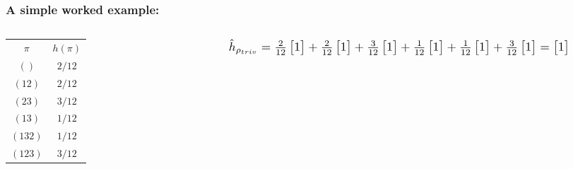 \documentclass{beamer} %
\theoremstyle{definition} %
\def \pausenl {\pause $ \ $\\}
\begin{document}
\begin{frame}
	\frametitle{A simple worked example:}
	
	\begin{columns}
		\begin{column}{.2\textwidth}

		


			\begin{tabular}{c<{\onslide<2->}c<{\onslide<1->}}
				$\pi$ & $h(\pi)$          \\
				$()$   & $2/12$   \\
				$(12)$   & $2/12$  \\
				$(23)$   & $3/12$  \\
				$(13)$   & $1/12$  \\
				$(132)$   & $1/12$  	\\
				$(123)$   & $3/12$    			
			\end{tabular}
\end{column}

\begin{column}{.8\textwidth}
	\pause
	\begin{equation*}
	\resizebox{\textwidth}{!}{$\hat{h}_{\rho_{triv}} = 
		\frac{2}{12}\begin{bmatrix} 1 \end{bmatrix} + 
		\frac{2}{12}\begin{bmatrix} 1 \end{bmatrix} + 
		\frac{3}{12}\begin{bmatrix} 1 \end{bmatrix} + 
		\frac{1}{12}\begin{bmatrix} 1 \end{bmatrix} + 
		\frac{1}{12}\begin{bmatrix} 1 \end{bmatrix} + 
		\frac{3}{12}\begin{bmatrix} 1 \end{bmatrix} = 
		\begin{bmatrix} 1 \end{bmatrix}$}
	\end{equation*}
	
	\pausenl
	

\end{column}
\end{columns}
\end{frame}
\end{document}
